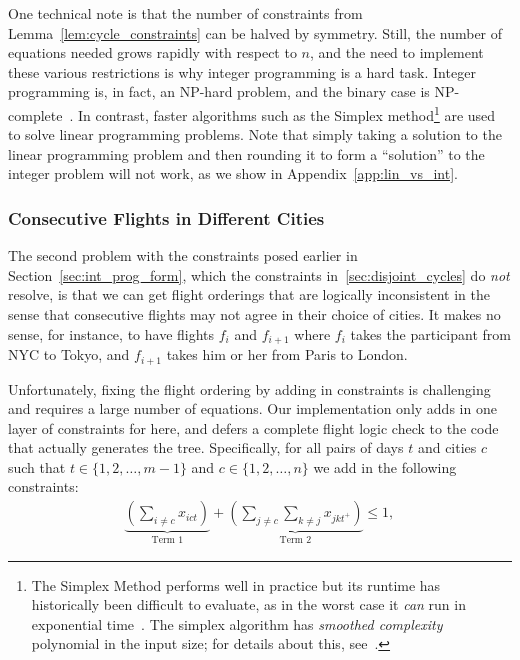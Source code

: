 \documentclass{article}
\begin{document}
One technical note is that the number of constraints from Lemma~\ref{lem:cycle_constraints} can be halved by symmetry. Still, the number of equations
needed grows rapidly with respect to $n$, and the need to implement these various restrictions is why integer programming is a hard task. Integer
programming is, in fact, an NP-hard problem, and the binary case is NP-complete~\cite{Kar72}. In contrast, faster algorithms such as the Simplex
method\footnote{The Simplex Method performs well in practice but its runtime has historically been difficult to evaluate, as in the worst case it
\emph{can} run in exponential time~\cite{Klee1972}. The simplex algorithm has \emph{smoothed complexity} polynomial in the input size; for details
about this, see~\cite{Spielman:2004:SAA:990308.990310}.} are used to solve linear programming problems. Note that simply taking a solution to the
linear programming problem and then rounding it to form a ``solution'' to the integer problem will not work, as we show in Appendix~\ref{app:lin_vs_int}.

\subsubsection{Consecutive Flights in Different Cities}

The second problem with the constraints posed earlier in Section~\ref{sec:int_prog_form}, which the constraints in~\ref{sec:disjoint_cycles} do
\emph{not} resolve, is that we can get flight orderings that are logically inconsistent in the sense that consecutive flights may not agree in their
choice of cities. It makes no sense, for instance, to have flights $f_i$ and $f_{i+1}$ where $f_i$ takes the participant from NYC to Tokyo, and
$f_{i+1}$ takes him or her from Paris to London.

Unfortunately, fixing the flight ordering by adding in constraints is challenging and requires a large number of equations. Our implementation only
adds in one layer of constraints for here, and defers a complete flight logic check to the code that actually generates the tree. Specifically, for
all pairs of days $t$ and cities $c$ such that $t \in \{1,2,\ldots, m-1\}$ and $c \in \{1,2,\ldots,n\}$ we add in the following constraints:
\begin{align}
\underbrace{\left(\sum_{i\ne c} x_{ict} \right)}_{\text{Term 1}} + \underbrace{\left( \sum_{j\ne c}\sum_{k\ne j} x_{jkt^+}\right)}_{\text{Term 2}} \le 1,
\end{align}
\end{document}
